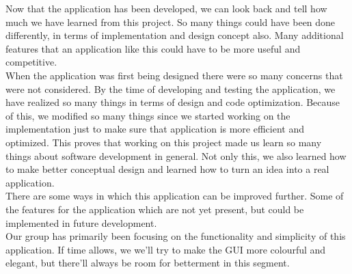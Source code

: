 Now that the application has been developed, we can look back and tell how much we have learned from this project. So many things could have been done differently, in terms of implementation and design concept also. Many additional features that an application like this could have to be more useful and competitive.\\

When the application was first being designed there were so many concerns that were not considered. By the time of developing and testing the application, we have realized so many things in terms of design and code optimization. Because of this, we modified so many things since we started working on the implementation just to make sure that application is more efficient and optimized. This proves that working on this project made us learn so many things about software development in general. Not only this, we also learned how to make better conceptual design and learned how to turn an idea into a real application.\\

There are some ways in which this application can be improved further. Some of the features for the application which are not yet present, but could be implemented in future development.\\

Our group has primarily been focusing on the functionality and simplicity of this application. If time allows, we we'll try to make the GUI more colourful and elegant, but there'll always be room for betterment in this segment.